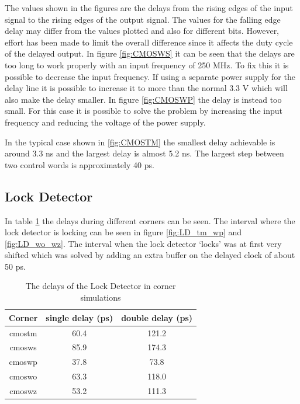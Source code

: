 \documentclass[a4paper,12pt]{article} \usepackage{graphicx}
\begin{document}
The values shown in the figures are the
delays from the rising edges of the input signal to the rising edges of the
output signal. The values for the falling edge delay may differ from the values
plotted and also for different bits. However, effort has been made to limit the
overall difference since it affects the duty cycle of the delayed output. 
In figure \ref{fig:CMOSWS} it can be seen that the delays are too long to work
properly with an input frequency of 250 MHz. To fix this it is possible to
decrease the input frequency. If using a separate power supply for the delay
line it is possible to increase it to more than the normal 3.3 V which will
also make the delay smaller. In figure \ref{fig:CMOSWP} the delay is instead too
small. For this case it is possible to solve the problem by increasing the input
frequency and reducing the voltage of the power supply.


In the typical case shown in \ref{fig:CMOSTM} the smallest delay achievable is
around 3.3 ns and the largest delay is almost 5.2 ns. The largest step between
two control words is approximately 40 ps. 

\subsection{Lock Detector}
In table \ref{tab:LD_delays_corner} the delays during different corners
can be seen. The interval where the lock detector is locking can be
seen in figure \ref{fig:LD_tm_wp} and \ref{fig:LD_wo_wz}. The
interval when the lock detector `locks' was at first very shifted
which was solved by adding an extra buffer on the delayed clock of
about 50 ps.
\begin{table}[h]
        \centering
        \begin{tabular}{|c|c|c|}
                \hline
                \textbf{Corner} & \textbf{single delay (ps)} &
                \textbf{double delay (ps)} \\
                \hline
                cmostm & 60.4 & 121.2 \\
                cmosws & 85.9 & 174.3 \\
                cmoswp & 37.8 & 73.8 \\
                cmoswo & 63.3 & 118.0 \\
                cmoswz & 53.2 & 111.3 \\
                \hline
        \end{tabular}
        \caption{The delays of the Lock Detector in corner simulations}
        \label{tab:LD_delays_corner}
\end{table}
\end{document}

